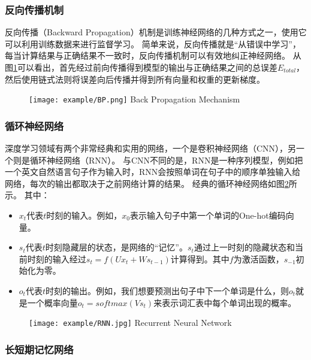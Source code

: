 \subsubsection{反向传播机制}

反向传播（Backward Propagation）机制\cite{rumelhart1986learning}是训练神经网络的几种方式之一，使用它可以利用训练数据来进行监督学习。
简单来说，反向传播就是“从错误中学习”，每当计算结果与正确结果不一致时，反向传播机制可以有效地纠正神经网络。
从图\ref{fig:BP}可以看出，首先经过前向传播得到模型的输出与正确结果之间的总误差$E_{total}$，然后使用链式法则将误差向后传播并得到所有向量和权重的更新梯度。

\begin{figure}[!htp]
  \centering
  \texttt{[image: example/BP.png]}
    {Back Propagation Mechanism}
  \label{fig:BP}
\end{figure}

\subsubsection{循环神经网络}

深度学习领域有两个非常经典和实用的网络，一个是卷积神经网络（CNN），另一个则是循环神经网络（RNN）\cite{goodfellow2016deep}。
与CNN不同的是，RNN是一种序列模型，例如把一个英文自然语言句子作为输入时，RNN会按照单词在句子中的顺序单独输入给网络，每次的输出都取决于之前网络计算的结果。
经典的循环神经网络如图\ref{fig:RNN}所示。
其中：
\begin{itemize}
  \item $x_t$代表$t$时刻的输入。例如，$x_0$表示输入句子中第一个单词的One-hot编码向量。
  \item $s_t$代表$t$时刻隐藏层的状态，是网络的“记忆”。$s_t$通过上一时刻的隐藏状态和当前时刻的输入经过$s_t = f(Ux_t + Ws_{t-1})$计算得到。其中$f$为激活函数，$s_{-1}$初始化为零。
  \item $o_t$代表$t$时刻的输出。例如，我们想要预测出句子中下一个单词是什么，则$o_t$就是一个概率向量$o_t = softmax(Vs_t)$来表示词汇表中每个单词出现的概率。
\end{itemize}

\begin{figure}[!htp]
  \centering
  \texttt{[image: example/RNN.jpg]}
    {Recurrent Neural Network}
  \label{fig:RNN}
\end{figure}

\subsubsection{长短期记忆网络}

